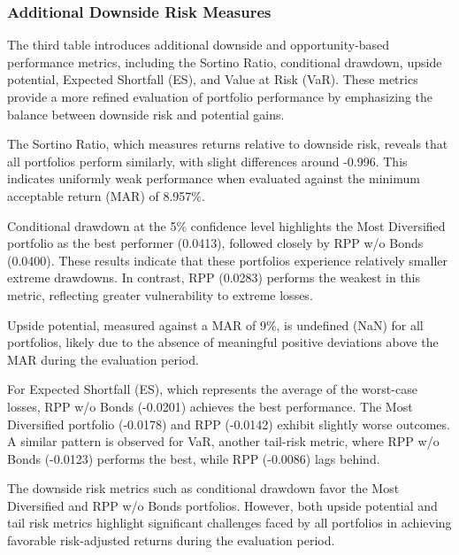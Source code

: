 \documentclass[11pt,preprint]{elsarticle}
\numberwithin{equation}{section}
\numberwithin{figure}{section}
\numberwithin{table}{section}
\begin{document}
\subsubsection{Additional Downside Risk
Measures}\label{additional-downside-risk-measures}

The third table introduces additional downside and opportunity-based
performance metrics, including the Sortino Ratio, conditional drawdown,
upside potential, Expected Shortfall (ES), and Value at Risk (VaR).
These metrics provide a more refined evaluation of portfolio performance
by emphasizing the balance between downside risk and potential gains.

The Sortino Ratio, which measures returns relative to downside risk,
reveals that all portfolios perform similarly, with slight differences
around -0.996. This indicates uniformly weak performance when evaluated
against the minimum acceptable return (MAR) of 8.957\%.

Conditional drawdown at the 5\% confidence level highlights the Most
Diversified portfolio as the best performer (0.0413), followed closely
by RPP w/o Bonds (0.0400). These results indicate that these portfolios
experience relatively smaller extreme drawdowns. In contrast, RPP
(0.0283) performs the weakest in this metric, reflecting greater
vulnerability to extreme losses.

Upside potential, measured against a MAR of 9\%, is undefined (NaN) for
all portfolios, likely due to the absence of meaningful positive
deviations above the MAR during the evaluation period.

For Expected Shortfall (ES), which represents the average of the
worst-case losses, RPP w/o Bonds (-0.0201) achieves the best
performance. The Most Diversified portfolio (-0.0178) and RPP (-0.0142)
exhibit slightly worse outcomes. A similar pattern is observed for VaR,
another tail-risk metric, where RPP w/o Bonds (-0.0123) performs the
best, while RPP (-0.0086) lags behind.

The downside risk metrics such as conditional drawdown favor the Most
Diversified and RPP w/o Bonds portfolios. However, both upside potential
and tail risk metrics highlight significant challenges faced by all
portfolios in achieving favorable risk-adjusted returns during the
evaluation period.
\end{document}
